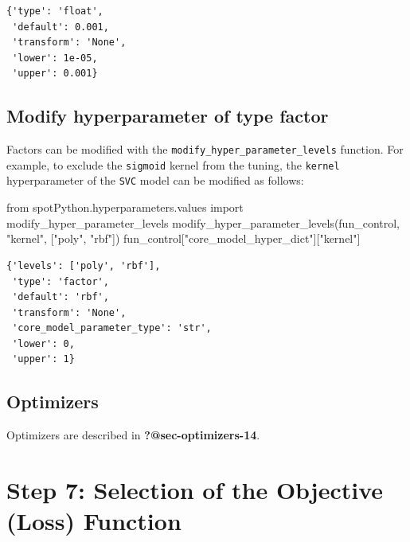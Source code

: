 \documentclass[
  letterpaper,
  DIV=11,
  numbers=noendperiod]{scrreprt}
\newenvironment{Shaded}{\begin{snugshade}}{\end{snugshade}}
\newcommand{\ImportTok}[1]{\textcolor[rgb]{0.00,0.46,0.62}{#1}}
\newcommand{\NormalTok}[1]{\textcolor[rgb]{0.00,0.23,0.31}{#1}}
\newcommand{\StringTok}[1]{\textcolor[rgb]{0.13,0.47,0.30}{#1}}
\begin{document}
\begin{verbatim}
{'type': 'float',
 'default': 0.001,
 'transform': 'None',
 'lower': 1e-05,
 'upper': 0.001}
\end{verbatim}

\hypertarget{modify-hyperparameter-of-type-factor}{%
\subsection{Modify hyperparameter of type
factor}\label{modify-hyperparameter-of-type-factor}}

Factors can be modified with the
\texttt{modify\_hyper\_parameter\_levels} function. For example, to
exclude the \texttt{sigmoid} kernel from the tuning, the \texttt{kernel}
hyperparameter of the \texttt{SVC} model can be modified as follows:

\begin{Shaded}
\begin{Highlighting}[]
\ImportTok{from}\NormalTok{ spotPython.hyperparameters.values }\ImportTok{import}\NormalTok{ modify\_hyper\_parameter\_levels}
\NormalTok{modify\_hyper\_parameter\_levels(fun\_control, }\StringTok{"kernel"}\NormalTok{, [}\StringTok{"poly"}\NormalTok{, }\StringTok{"rbf"}\NormalTok{])}
\NormalTok{fun\_control[}\StringTok{"core\_model\_hyper\_dict"}\NormalTok{][}\StringTok{"kernel"}\NormalTok{]}
\end{Highlighting}
\end{Shaded}

\begin{verbatim}
{'levels': ['poly', 'rbf'],
 'type': 'factor',
 'default': 'rbf',
 'transform': 'None',
 'core_model_parameter_type': 'str',
 'lower': 0,
 'upper': 1}
\end{verbatim}

\hypertarget{sec-optimizers-10}{%
\subsection{Optimizers}\label{sec-optimizers-10}}

Optimizers are described in \textbf{?@sec-optimizers-14}.

\hypertarget{step-7-selection-of-the-objective-loss-function}{%
\section{Step 7: Selection of the Objective (Loss)
Function}\label{step-7-selection-of-the-objective-loss-function}}
\end{document}
